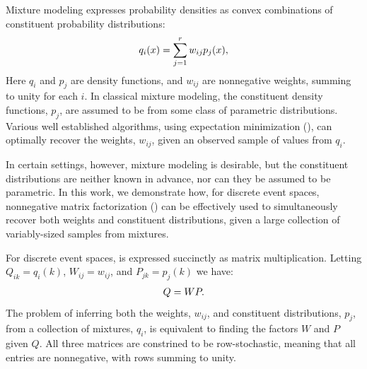 \documentclass[conference]{IEEEtran}
\title{\vspace{-0.25em}\thetitle}
\author{
{\large{Stefan~Karpinski, John~R.~Gilbert, Elizabeth~M.~Belding}} \vspace{0.25em}\\
Department of Computer Science \\
University of California, Santa Barbara \vspace{0.35em}\\
\textit{\{sgk,gilbert,ebelding\}@cs.ucsb.edu}
}
\begin{document}
\maketitle

Mixture modeling expresses probability densities as convex combinations of constituent probability distributions:
\begin{align}\eqn{mixture-model}
  q_i(x) = \sum_{j=1}^r w_{ij} p_j(x),
\end{align}
Here $q_i$ and $p_j$ are density functions, and $w_{ij}$ are nonnegative weights, summing to unity for each $i$.
In classical mixture modeling, the constituent density functions, $p_j$, are assumed to be from some class of parametric distributions.
Various well established algorithms, using expectation minimization (), can optimally recover the weights, $w_{ij}$, given an observed sample of values from $q_i$.

In certain settings, however, mixture modeling is desirable, but the constituent distributions are neither known in advance, nor can they be assumed to be parametric.
In this work, we demonstrate how, for discrete event spaces, nonnegative matrix factorization () can be effectively used to simultaneously recover both weights and constituent distributions, given a large collection of variably-sized samples from mixtures.

For discrete event spaces,  is expressed succinctly as matrix multiplication.
Letting $Q_{ik} = q_i(k)$, $W_{ij} = w_{ij}$, and $P_{jk} = p_j(k)$ we have:
\begin{align}\eqn{mixture-model-matrix}
  Q = WP.
\end{align}
The problem of inferring both the weights, $w_{ij}$, and constituent distributions, $p_j$, from a collection of mixtures, $q_i$, is equivalent to finding the factors $W$ and $P$ given $Q$.
All three matrices are constrined to be row-stochastic, meaning that all entries are nonnegative, with rows summing to unity.
\end{document}
